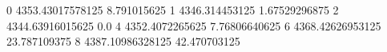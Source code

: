 0 4353.43017578125 8.791015625
1 4346.314453125 1.67529296875
2 4344.63916015625 0.0
4 4352.4072265625 7.76806640625
6 4368.42626953125 23.787109375
8 4387.10986328125 42.470703125
